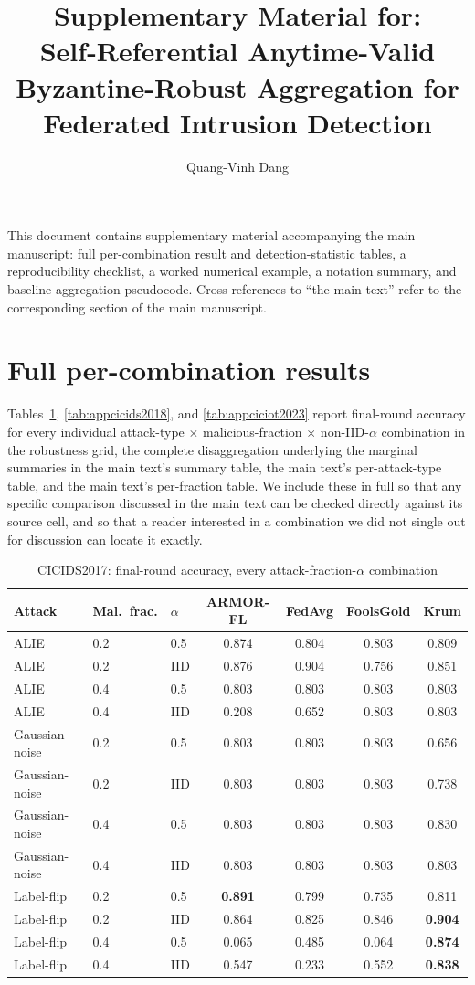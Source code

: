 \documentclass[a4paper,11pt]{article}
\title{Supplementary Material for:\\Self-Referential Anytime-Valid Byzantine-Robust Aggregation for Federated Intrusion Detection}
\author{Quang-Vinh Dang}
\date{}
\begin{document}
\maketitle

\noindent This document contains supplementary material accompanying the main manuscript: full per-combination result and detection-statistic tables, a reproducibility checklist, a worked numerical example, a notation summary, and baseline aggregation pseudocode. Cross-references to ``the main text'' refer to the corresponding section of the main manuscript.


\section{Full per-combination results}\label{app:full}

Tables~\ref{tab:appcicids2017}, \ref{tab:appcicids2018}, and \ref{tab:appciciot2023} report final-round accuracy for every individual attack-type $\times$ malicious-fraction $\times$ non-IID-$\alpha$ combination in the robustness grid, the complete disaggregation underlying the marginal summaries in the main text's summary table, the main text's per-attack-type table, and the main text's per-fraction table. We include these in full so that any specific comparison discussed in the main text can be checked directly against its source cell, and so that a reader interested in a combination we did not single out for discussion can locate it exactly.

\begin{table}[htbp]
\centering
\caption{CICIDS2017: final-round accuracy, every attack-fraction-$\alpha$ combination}\label{tab:appcicids2017}
\begin{tabular}{@{}lllcccc@{}}
\toprule
Attack & Mal.\ frac. & $\alpha$ & ARMOR-FL & FedAvg & FoolsGold & Krum \\
\midrule
ALIE & 0.2 & 0.5 & 0.874 & 0.804 & 0.803 & 0.809 \\
ALIE & 0.2 & IID & 0.876 & 0.904 & 0.756 & 0.851 \\
ALIE & 0.4 & 0.5 & 0.803 & 0.803 & 0.803 & 0.803 \\
ALIE & 0.4 & IID & 0.208 & 0.652 & 0.803 & 0.803 \\
Gaussian-noise & 0.2 & 0.5 & 0.803 & 0.803 & 0.803 & 0.656 \\
Gaussian-noise & 0.2 & IID & 0.803 & 0.803 & 0.803 & 0.738 \\
Gaussian-noise & 0.4 & 0.5 & 0.803 & 0.803 & 0.803 & 0.830 \\
Gaussian-noise & 0.4 & IID & 0.803 & 0.803 & 0.803 & 0.803 \\
Label-flip & 0.2 & 0.5 & \textbf{0.891} & 0.799 & 0.735 & 0.811 \\
Label-flip & 0.2 & IID & 0.864 & 0.825 & 0.846 & \textbf{0.904} \\
Label-flip & 0.4 & 0.5 & 0.065 & 0.485 & 0.064 & \textbf{0.874} \\
Label-flip & 0.4 & IID & 0.547 & 0.233 & 0.552 & \textbf{0.838} \\
\bottomrule
\end{tabular}
\end{table}
\end{document}
